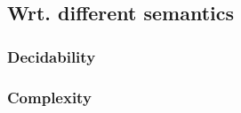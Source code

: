         \subsection{Wrt. different semantics}
            \subsubsection{Decidability}
            
            \subsubsection{Complexity}
    
